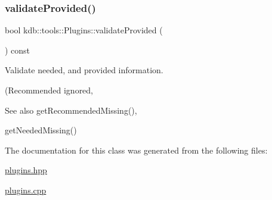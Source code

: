 \subsubsection{\texorpdfstring{validateProvided()}{validateProvided()}}
{\footnotesize\ttfamily bool kdb\+::tools\+::\+Plugins\+::validate\+Provided (\begin{DoxyParamCaption}{ }\end{DoxyParamCaption}) const}



Validate needed, and provided information. 

(Recommended ignored, \begin{DoxySeeAlso}{See also}
get\+Recommended\+Missing(), 

get\+Needed\+Missing() 
\end{DoxySeeAlso}


The documentation for this class was generated from the following files\+:\begin{DoxyCompactItemize}
\item 
\mbox{\hyperlink{plugins_8hpp}{plugins.\+hpp}}\item 
\mbox{\hyperlink{plugins_8cpp}{plugins.\+cpp}}\end{DoxyCompactItemize}
